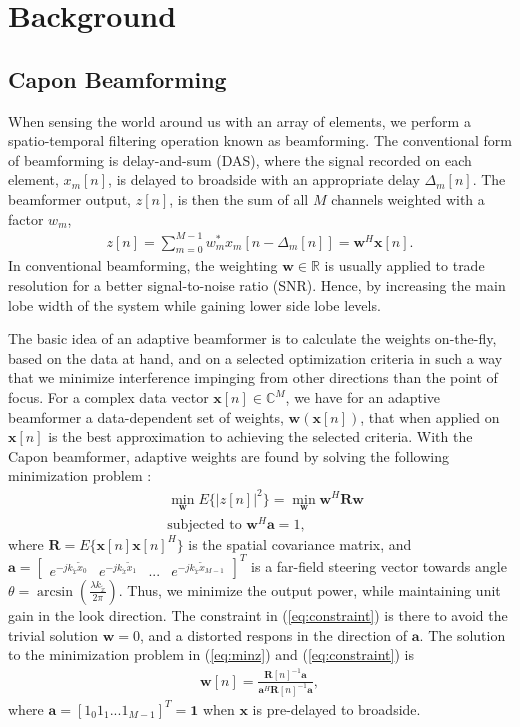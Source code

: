 \documentclass[journal]{IEEEtran}
\newcommand{\mat}[1]{\mathbf{#1}}
\renewcommand{\vec}[1]{\mathbf{#1}}
\begin{document}
\section{Background}
\subsection{Capon Beamforming}
When sensing the world around us with an array of elements, we perform a spatio-temporal filtering operation known as beamforming. The conventional form of beamforming is delay-and-sum (DAS), where the signal recorded on each element, $x_m[n]$, is delayed to broadside with an appropriate delay $\Delta_m[n]$. The beamformer output, $z[n]$, is then the sum of all $M$ channels weighted with a factor $w_m$,
\begin{align}
z[n] = \sum_{m = 0}^{M-1}w_m^*x_m[n - \Delta_m[n]] = \vec{w}^H\vec{x}[n].
\end{align}
In conventional beamforming, the weighting $\vec{w} \in \mathbb{R}$ is usually applied to trade resolution for a better signal-to-noise ratio (SNR). Hence, by increasing the main lobe width of the system while gaining lower side lobe levels. 

The basic idea of an adaptive beamformer is to calculate the weights on-the-fly, based on the data at hand, and on a selected optimization criteria in such a way that we minimize interference impinging from other directions than the point of focus. For a complex data vector $\vec{x}[n] \in \mathbb{C}^M$, we have for an adaptive beamformer a data-dependent set of weights, $\vec{w}(\vec{x}[n])$, that when applied on $\vec{x}[n]$ is the best approximation to achieving the selected criteria. With the Capon beamformer, adaptive weights are found by solving the following minimization problem \cite{Capon1969}:
\begin{align}
&\min_{\vec{w}} E\{|z[n]|^2\} = \min_{\vec{w}}\vec{w}^H\mat{R}\vec{w}\label{eq:minz}\\
&\text{subjected to } \vec{w}^H\vec{a} = 1,\label{eq:constraint}
\end{align}
where $\mat{R} = E\{\vec{x}[n]\vec{x}[n]^H\}$ is the spatial covariance matrix, and $\vec{a} = \left[ \begin{array}{cccc} e^{-jk_{\tilde{x}}\tilde{x}_0}& e^{-jk_{\tilde{x}}\tilde{x}_1}& ...& e^{-jk_{\tilde{x}}\tilde{x}_{M-1}}\end{array}\right] ^T$ is a far-field steering vector towards angle $\theta = \arcsin(\frac{\lambda k_{\tilde{x}}}{2\pi})$.
Thus, we minimize the output power, while maintaining unit gain in the look direction. The constraint in (\ref{eq:constraint}) is there to avoid the trivial solution $\vec{w} = 0$, and a distorted respons in the direction of $\vec{a}$. The solution to the minimization problem in (\ref{eq:minz}) and (\ref{eq:constraint}) is
\begin{align}\label{eq:w}
\vec{w}[n] = \frac{\mat{R}[n]^{-1}\vec{a}}{\vec{a}^H\mat{R}[n]^{-1}\vec{a}},
\end{align}
where $\vec{a} = [1_0 1_1... 1_{M-1}]^T = \vec{1}$ when $\vec{x}$ is pre-delayed to broadside. 
\end{document}
